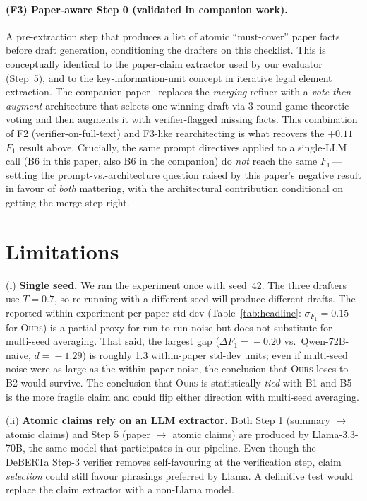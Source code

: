 \documentclass[11pt,a4paper]{article}
\begin{document}
\paragraph{(F3) Paper-aware Step 0 (validated in companion work).}
A pre-extraction step that produces a list of atomic ``must-cover''
paper facts before draft generation, conditioning the drafters on
this checklist. This is conceptually identical to the paper-claim
extractor used by our evaluator (Step~5), and to the key-information-unit
\citep[KIU,][]{illmv2025bigdata} concept in iterative legal element
extraction. The companion paper~\cite{sun2026onevision} replaces the
\emph{merging} refiner with a \emph{vote-then-augment} architecture
that selects one winning draft via 3-round game-theoretic voting and
then augments it with verifier-flagged missing facts. This combination
of F2 (verifier-on-full-text) and F3-like rearchitecting is what
recovers the $+0.11$ $F_1$ result above. Crucially, the same prompt
directives applied to a single-LLM call (B6 in this paper, also B6 in
the companion) do \emph{not} reach the same $F_1$\,---\,settling the
prompt-vs.-architecture question raised by this paper's negative
result in favour of \emph{both} mattering, with the architectural
contribution conditional on getting the merge step right.

\section{Limitations}
\label{sec:limits}

(i) \textbf{Single seed.} We ran the experiment once with seed~42. The
three drafters use $T\!=\!0.7$, so re-running with a different seed will
produce different drafts. The reported within-experiment per-paper
std-dev (Table~\ref{tab:headline}: $\sigma_{F_1}\!=\!0.15$ for
\textsc{Ours}) is a partial proxy for run-to-run noise but does not
substitute for multi-seed averaging. That said, the largest gap
($\Delta F_1\!=\!-0.20$ vs.\ Qwen-72B-naive, $d\!=\!-1.29$) is roughly
1.3 within-paper std-dev units; even if multi-seed noise were as large
as the within-paper noise, the conclusion that \textsc{Ours} loses to
B2 would survive. The conclusion that \textsc{Ours} is statistically
\emph{tied} with B1 and B5 is the more fragile claim and could flip
either direction with multi-seed averaging.

(ii) \textbf{Atomic claims rely on an LLM extractor.} Both Step 1
(summary $\to$ atomic claims) and Step 5 (paper $\to$ atomic claims)
are produced by Llama-3.3-70B, the same model that participates in our
pipeline. Even though the DeBERTa Step-3 verifier removes self-favouring
at the verification step, claim \emph{selection} could still favour
phrasings preferred by Llama. A definitive test would replace the claim
extractor with a non-Llama model.
\end{document}
